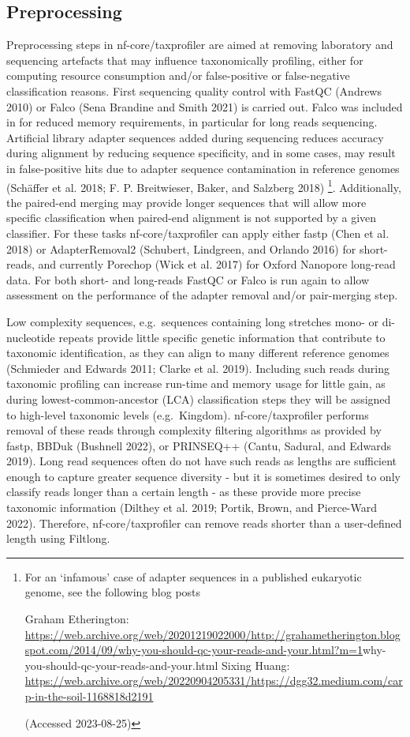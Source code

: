 \documentclass[
]{article}
\begin{document}
\hypertarget{preprocessing}{%
\subsection{Preprocessing}\label{preprocessing}}

Preprocessing steps in nf-core/taxprofiler are aimed at removing
laboratory and sequencing artefacts that may influence taxonomically
profiling, either for computing resource consumption and/or
false-positive or false-negative classification reasons. First
sequencing quality control with FastQC (Andrews 2010) or Falco (Sena
Brandine and Smith 2021) is carried out. Falco was included in for
reduced memory requirements, in particular for long reads sequencing.
Artificial library adapter sequences added during sequencing reduces
accuracy during alignment by reducing sequence specificity, and in some
cases, may result in false-positive hits due to adapter sequence
contamination in reference genomes (Schäffer et al. 2018; F. P.
Breitwieser, Baker, and Salzberg 2018) \footnote{For an `infamous' case
  of adapter sequences in a published eukaryotic genome, see the
  following blog posts

  Graham Etherington:
  \url{https://web.archive.org/web/20201219022000/http://grahametherington.blogspot.com/2014/09/why-you-should-qc-your-reads-and-your.html?m=1}why-you-should-qc-your-reads-and-your.html
  Sixing Huang:
  \url{https://web.archive.org/web/20220904205331/https://dgg32.medium.com/carp-in-the-soil-1168818d2191}

  (Accessed 2023-08-25)}. Additionally, the paired-end merging may
provide longer sequences that will allow more specific classification
when paired-end alignment is not supported by a given classifier. For
these tasks nf-core/taxprofiler can apply either fastp (Chen et al.
2018) or AdapterRemoval2 (Schubert, Lindgreen, and Orlando 2016) for
short-reads, and currently Porechop (Wick et al. 2017) for Oxford
Nanopore long-read data. For both short- and long-reads FastQC or Falco
is run again to allow assessment on the performance of the adapter
removal and/or pair-merging step.

Low complexity sequences, e.g.~sequences containing long stretches mono-
or di-nucleotide repeats provide little specific genetic information
that contribute to taxonomic identification, as they can align to many
different reference genomes (Schmieder and Edwards 2011; Clarke et al.
2019). Including such reads during taxonomic profiling can increase
run-time and memory usage for little gain, as during
lowest-common-ancestor (LCA) classification steps they will be assigned
to high-level taxonomic levels (e.g.~Kingdom). nf-core/taxprofiler
performs removal of these reads through complexity filtering algorithms
as provided by fastp, BBDuk (Bushnell 2022), or PRINSEQ++ (Cantu,
Sadural, and Edwards 2019). Long read sequences often do not have such
reads as lengths are sufficient enough to capture greater sequence
diversity - but it is sometimes desired to only classify reads longer
than a certain length - as these provide more precise taxonomic
information (Dilthey et al. 2019; Portik, Brown, and Pierce-Ward 2022).
Therefore, nf-core/taxprofiler can remove reads shorter than a
user-defined length using Filtlong.
\end{document}
